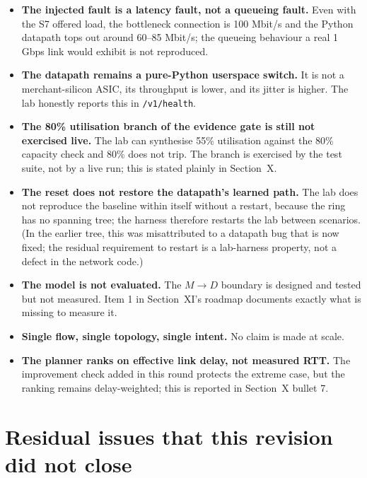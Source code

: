 \documentclass[11pt,a4paper]{article}
\begin{document}
\begin{itemize}
\item \textbf{The injected fault is a latency fault, not a queueing fault.}
  Even with the S7 offered load, the bottleneck connection is 100 Mbit/s and
  the Python datapath tops out around 60--85 Mbit/s; the queueing behaviour
  a real 1 Gbps link would exhibit is not reproduced.
\item \textbf{The datapath remains a pure-Python userspace switch.} It is not
  a merchant-silicon ASIC, its throughput is lower, and its jitter is
  higher. The lab honestly reports this in \texttt{/v1/health}.
\item \textbf{The 80\% utilisation branch of the evidence gate is still not
  exercised live.} The lab can synthesise 55\% utilisation against the
  80\% capacity check and 80\% does not trip. The branch is exercised by the
  test suite, not by a live run; this is stated plainly in Section~X.
\item \textbf{The reset does not restore the datapath's learned path.} The lab
  does not reproduce the baseline within itself without a restart, because the
  ring has no spanning tree; the harness therefore restarts the lab between
  scenarios. (In the earlier tree, this was misattributed to a datapath bug
  that is now fixed; the residual requirement to restart is a lab-harness
  property, not a defect in the network code.)
\item \textbf{The model is not evaluated.} The $M \to D$ boundary is
  designed and tested but not measured. Item 1 in Section~XI's roadmap
  documents exactly what is missing to measure it.
\item \textbf{Single flow, single topology, single intent.} No claim is made
  at scale.
\item \textbf{The planner ranks on effective link delay, not measured RTT.}
  The improvement check added in this round protects the extreme case, but
  the ranking remains delay-weighted; this is reported in Section~X bullet 7.
\end{itemize}

\section{Residual issues that this revision did not close}
\end{document}
